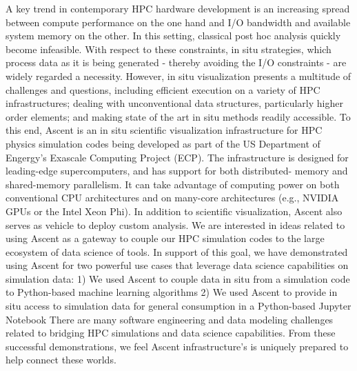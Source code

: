 \license


A key trend in contemporary HPC hardware development is an increasing spread between compute performance on the one hand and I/O bandwidth and available system memory on the other. In this setting, classical post hoc analysis quickly become infeasible. With respect to these constraints, in situ strategies, which process data as it is being generated - thereby avoiding the I/O constraints - are widely regarded a necessity. However, in situ visualization presents a multitude of challenges and questions, including efficient execution on a variety of HPC infrastructures; dealing with unconventional data structures, particularly higher order elements; and making state of the art in situ methods readily accessible. To this end, Ascent is an in situ scientific visualization infrastructure for HPC physics simulation codes being developed as part of the US Department of Engergy's Exascale Computing Project (ECP). The infrastructure is designed for leading-edge supercomputers, and has support for both distributed- memory and shared-memory parallelism. It can take advantage of computing power on both conventional CPU architectures and on many-core architectures (e.g., NVIDIA GPUs or the Intel Xeon Phi). In addition to scientific visualization, Ascent also serves as vehicle to deploy custom analysis. We are interested in ideas related to using Ascent as a gateway to couple our HPC simulation codes to the large ecosystem of data science of tools. In support of this goal, we have demonstrated using Ascent for two powerful use cases that leverage data science capabilities on simulation data: 1) We used Ascent to couple data in situ from a simulation code to Python-based machine learning algorithms 2) We used Ascent to provide in situ access to simulation data for general consumption in a Python-based Jupyter Notebook There are many software engineering and data modeling challenges related to bridging HPC simulations and data science capabilities. From these successful demonstrations, we feel Ascent infrastructure's is uniquely prepared to help connect these worlds.

